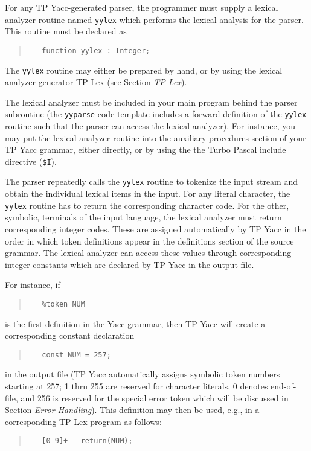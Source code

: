 For any TP Yacc-generated parser, the programmer must supply a lexical
analyzer routine named \verb"yylex" which performs the lexical analysis for
the parser. This routine must be declared as

\begin{quote}\begin{verbatim}
   function yylex : Integer;
\end{verbatim}\end{quote}

The \verb"yylex" routine may either be prepared by hand, or by using the
lexical analyzer generator TP Lex (see Section {\em TP Lex\/}).

The lexical analyzer must be included in your main program behind the
parser subroutine (the \verb"yyparse" code template includes a forward
definition of the \verb"yylex" routine such that the parser can access the
lexical analyzer). For instance, you may put the lexical analyzer
routine into the auxiliary procedures section of your TP Yacc grammar,
either directly, or by using the the Turbo Pascal include directive
(\verb"$I").

The parser repeatedly calls the \verb"yylex" routine to tokenize the input
stream and obtain the individual lexical items in the input. For any
literal character, the \verb"yylex" routine has to return the corresponding
character code. For the other, symbolic, terminals of the input language,
the lexical analyzer must return corresponding integer codes. These are
assigned automatically by TP Yacc in the order in which token definitions
appear in the definitions section of the source grammar. The lexical
analyzer can access these values through corresponding integer constants
which are declared by TP Yacc in the output file.

For instance, if
\begin{quote}\begin{verbatim}
   %token NUM
\end{verbatim}\end{quote}
is the first definition in the Yacc grammar, then TP Yacc will create
a corresponding constant declaration
\begin{quote}\begin{verbatim}
   const NUM = 257;
\end{verbatim}\end{quote}
in the output file (TP Yacc automatically assigns symbolic token numbers
starting at 257; 1 thru 255 are reserved for character literals, 0 denotes
end-of-file, and 256 is reserved for the special error token which will be
discussed in Section {\em Error Handling\/}). This definition may then be
used, e.g., in a corresponding TP Lex program as follows:
\begin{quote}\begin{verbatim}
   [0-9]+   return(NUM);
\end{verbatim}\end{quote}

